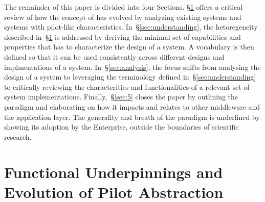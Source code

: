 \documentclass{sig-alternate}
\begin{document}

The remainder of this paper is divided into four Sections. \S\ref{sec:history}
offers a critical review of how the concept of \pilotjobs has evolved by
analyzing existing \pilot systems and systems with pilot-like characteristics.
In~\S\ref{sec:understanding}, the hetoregeneity described
in~\S\ref{sec:history} is addressed by deriving the minimal set of capabilities
and properties that has to characterize the design of a \pilot system. A
vocabulary is then defined so that it can be used consistently across different
designs and implmentations of a \pilot system. In~\S\ref{sec:analysis}, the
focus shifts from analysing the design of a \pilot system to  leveraging the
terminology defined in~\S\ref{sec:understanding} to critically reviewing the
characteritics and functionalities of a relevant set of \pilot system
implementations. Finally,~\S\ref{sec:5} closes the paper by outlining the
\pilot paradigm and elaborating on how it impacts and relates to other
middleware and the application layer. The generality and breath of the
\pilot paradigm is underlined by showing its adoption by the
Enterprise, outside the boundaries of scientific research.

%
\section{Functional Underpinnings and Evolution of Pilot Abstraction}
\label{sec:history}



\end{document}
